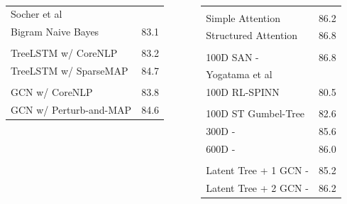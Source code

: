 \begin{frame}
\small
\begin{columns}
\begin{column}{.4\textwidth}
 \\[1ex]
\begin{tabular}{l r}
\multicolumn{2}{l}{Socher et al} \\
Bigram Naive Bayes     & 83.1 \\[.3ex]
\multicolumn{2}{l}{\citep{sparsemapcg}} \\
TreeLSTM w/ CoreNLP    & 83.2 \\
TreeLSTM w/ SparseMAP  & 84.7 \\[.3ex]
\multicolumn{2}{l}{\citep{corro2019acl}} \\
GCN w/ CoreNLP         & 83.8 \\
GCN w/ Perturb-and-MAP & 84.6
\end{tabular}
\end{column}
\begin{column}{.6\textwidth}
 \\[1ex]
\begin{tabular}{l r}
\multicolumn{2}{l}{\citep{structured_attn}} \\
Simple Attention & 86.2 \\
Structured Attention & 86.8 \\[.3ex]
\multicolumn{2}{l}{\citep{lapata}} \\
100D SAN - & 86.8 \\[.3ex]
\multicolumn{2}{l}{Yogatama et al} \\
100D RL-SPINN     & 80.5 \\[.3ex]
\multicolumn{2}{l}{\citep{choi2017learning}} \\
100D ST Gumbel-Tree & 82.6 \\
300D - & 85.6 \\
600D - & 86.0 \\[.3ex]
\multicolumn{2}{l}{\citep{corro2019acl}} \\
Latent Tree + 1 GCN - & 85.2 \\
Latent Tree + 2 GCN - & 86.2 \\[.3ex]
\end{tabular}
\end{column}
\end{columns}
\end{frame}
%
